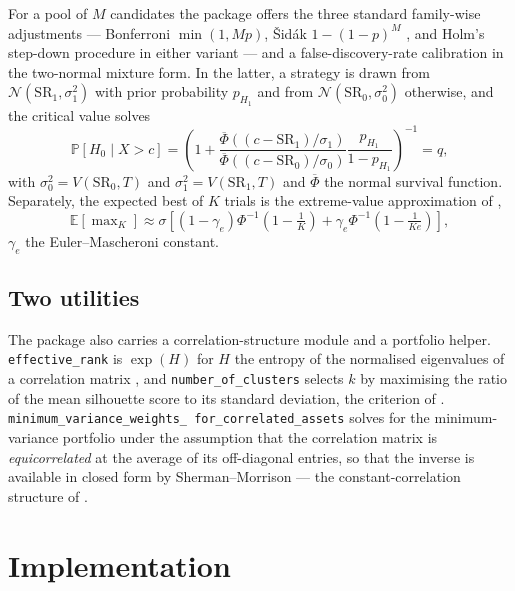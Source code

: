 \documentclass[11pt,a4paper]{article}
\newcommand{\code}[1]{\texttt{#1}}
\newcommand{\SR}{\mathrm{SR}}
\begin{document}
For a pool of $M$ candidates the package offers the three standard
family-wise adjustments --- Bonferroni $\min(1, Mp)$, {\v S}id{\'a}k
$1 - (1-p)^M$ \citep{sidak1967}, and Holm's step-down procedure
\citep{holm1979} in either variant --- and a false-discovery-rate calibration
\citep{benjamini1995,storey2002} in the two-normal mixture form. In the latter,
a strategy is drawn from $\mathcal{N}(\SR_1, \sigma_1^2)$ with prior
probability $p_{H_1}$ and from $\mathcal{N}(\SR_0, \sigma_0^2)$ otherwise, and
the critical value solves
\begin{equation}
  \mathbb{P}[H_0 \mid X > c] =
  \left( 1 + \frac{\overline{\Phi}((c - \SR_1)/\sigma_1)}
                  {\overline{\Phi}((c - \SR_0)/\sigma_0)}
          \frac{p_{H_1}}{1 - p_{H_1}} \right)^{-1} = q ,
  \label{eq:fdr}
\end{equation}
with $\sigma_0^2 = V(\SR_0, T)$ and $\sigma_1^2 = V(\SR_1, T)$ and
$\overline{\Phi}$ the normal survival function. Separately, the expected best
of $K$ trials is the extreme-value approximation of \citet{bailey2014},
\begin{equation}
  \mathbb{E}[\max\nolimits_K] \approx \sigma \left[
    (1 - \gamma_e)\Phi^{-1}\!\left(1 - \tfrac{1}{K}\right)
    + \gamma_e \Phi^{-1}\!\left(1 - \tfrac{1}{Ke}\right) \right],
  \label{eq:emax}
\end{equation}
$\gamma_e$ the Euler--Mascheroni constant.

\subsection{Two utilities}

The package also carries a correlation-structure module and a portfolio
helper. \code{effective\_rank} is $\exp(H)$ for $H$ the entropy of the
normalised eigenvalues of a correlation matrix \citep{roy2007}, and
\code{number\_of\_clusters} selects $k$ by maximising the ratio of the mean
silhouette score \citep{rousseeuw1987} to its standard deviation, the
criterion of \citet{lopezdeprado2018}. \code{minimum\_variance\_weights\_%
for\_correlated\_assets} solves for the minimum-variance portfolio under the
assumption that the correlation matrix is \emph{equicorrelated} at the average
of its off-diagonal entries, so that the inverse is available in closed form by
Sherman--Morrison --- the constant-correlation structure of \citet{elton1976}.

\section{Implementation}
\label{sec:impl}
\end{document}
